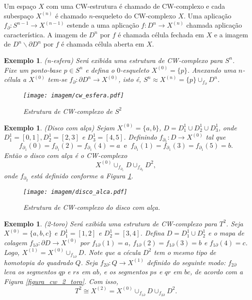 \documentclass[12pt]{book}
\newtheorem{exemplo}[teorema]{Exemplo}
\newcommand{\celula}[2]{D^{#1}_{#2}}
\newcommand{\complementar}[2]{#1 \backslash #2}
\newcommand{\skeleton}[1]{X^{(#1)}}
\begin{document}
	Um espaço $X$ com uma CW-estrutura é chamado de CW-complexo e cada subespaço $\skeleton{n}$ é chamado $n$-esqueleto do CW-complexo $X$. Uma aplicação $f_{\partial}:S^{n-1} \to \skeleton{n-1}$ estende a uma aplicação $f:D^{n} \to \skeleton{n}$ chamada aplicação característica. A imagem de $D^{n}$ por $f$ é chamada célula fechada em $X$ e a imagem de $\complementar{D^{n}}{\partial D^{n}} $ por $f$ é chamada célula aberta em $X$.
	
	\begin{exemplo}\label{exemplo_cw_n_esfera}
		(n-esfera) Será exibida uma estrutura de CW-complexo para $S^{n}$. Fixe um ponto-base $p \in S^{n}$ e defina o $0$-esqueleto $\skeleton{0}=\{p\}$. Anexando uma $n$-célula a $\skeleton{0}$ tem-se $f_{\partial}: \partial D^{n} \to \skeleton{0}$, isto é, $S^{n} \approx \skeleton{n} = \{p\}\cup_{f_{\partial}} \celula{n}{}$.
		\begin{figure}[!h]
			\centering
			\texttt{[image: imagem/cw\_esfera.pdf]}
			\caption{Estrutura de CW-complexo de $S^{2 }$}
		\end{figure}
	\end{exemplo}

	
	\begin{exemplo}
		(Disco com alça) Sejam $\skeleton{0}=\{a,b\}$, $D = D^{1}_{1}\cup D^{1}_{2}\cup D^{1}_{3}$, onde $D^{1}_{1} = [0,1],D^{1}_{2} = [2,3]$ e $D^{1}_{3} = [4,5]$. Definindo $f_{\partial_{1}}: D \to \skeleton{0}$ tal que 
		$$
		f_{\partial_{1}}(0)=f_{\partial_{1}}(2)=f_{\partial_{1}}(4)=a \;\;\text{e}\;\;
		f_{\partial_{1}}(1)=f_{\partial_{1}}(3)=f_{\partial_{1}}(5)=b.
		$$
		Então o disco com alça é o CW-complexo
		$$
		\skeleton{0} \cup_{f_{\partial_{1}}}D \cup_{f_{\partial_{2}}}D^{2},
		$$
		onde $f_{\partial_{2}}$ está definido conforme a Figura \ref{figura_cw_disco_com_alca}.
		
		\begin{figure}[!h]
			\centering
			\texttt{[image: imagem/disco\_alca.pdf]}
			\caption{Estrutura de CW-complexo do disco com alça.}
			\label{figura_cw_disco_com_alca}
		\end{figure}   
	\end{exemplo}
	
	\begin{exemplo}\label{exemplo_cw_toro}
		(2-toro) Será exibida uma estrutura de CW-complexo para $T^{2}$. Seja $\skeleton{0} = \{a,b,c\}$ e $D^{1}_{1} = [1,2]$ e $D^{1}_{2} = [3,4]$. Defina $D = D^{1}_{1}\cup D^{1}_{2}$ e o mapa de colagem $f_{1\partial}: \partial D\to \skeleton{0}$ por $f_{1\partial}(1) = a$, $f_{1\partial}(2) = f_{1\partial}(3) = b$ e $f_{1\partial}(4)=c$. Logo, $\skeleton{1} = \skeleton{0}\cup_{f_{1\partial}} D$. Note que a cécula $D^{2}$ tem o mesmo tipo de homotopia do quadrado $Q$. Seja $f_{2\partial}: Q\to \skeleton{1}$ definido do seguinte modo: $f_{2\partial}$ leva os segmentos $qp$ e $rs$ em $ab$, e os segmentos $ps$ e $qr$ em $bc$, de acordo com a Figura \ref{figura_cw_2_toro}. Com isso, 
		$$
		T^{2} \cong \skeleton{2} = \skeleton{0}\cup_{f_{1\partial}}D \cup_{f_{2\partial}}D^{2}.
		$$
	\end{exemplo}
	
\end{document}
